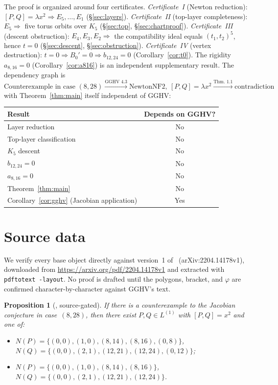 \documentclass[a4paper,11pt]{article}
\theoremstyle{plain}
\newtheorem{proposition}[theorem]{Proposition}
\theoremstyle{definition}
\theoremstyle{remark}
\begin{document}
The proof is organized around four certificates. \emph{Certificate~I} (Newton reduction): $[P,Q]=\lambda x^2\Rightarrow E_5,\dots,E_1$ (\S\ref{sec:layers}). \emph{Certificate~II} (top-layer completeness): $E_5\Rightarrow$ five torus orbits over $K_5$ (\S\ref{sec:top}, \S\ref{sec:chartproof}). \emph{Certificate~III} (descent obstruction): $E_4,E_3,E_2\Rightarrow$ the compatibility ideal equals $(t_1,t_2)^5$, hence $t=0$ (\S\ref{sec:descent}, \S\ref{sec:obstruction}). \emph{Certificate~IV} (vertex destruction): $t=0\Rightarrow B_0'=0\Rightarrow b_{12,24}=0$ (Corollary~\ref{cor:t0}). The rigidity $a_{8,16}=0$ (Corollary~\ref{cor:a816}) is an independent supplementary result. The dependency graph is
\[
\boxed{\text{Counterexample in case }(8,28)\xrightarrow{\text{GGHV 4.3}} \text{NewtonNF2},\ [P,Q]=\lambda x^2 \xrightarrow{\text{Thm.~1.1}} \text{contradiction}}
\]
with Theorem~\ref{thm:main} itself independent of GGHV:
\begin{center}
\begin{tabular}{l|c}
\textbf{Result} & \textbf{Depends on GGHV?} \\ \midrule
Layer reduction & No \\
Top-layer classification & No \\
$K_5$ descent & No \\
$b_{12,24}=0$ & No \\
$a_{8,16}=0$ & No \\
Theorem~\ref{thm:main} & No \\
Corollary~\ref{cor:gghv} (Jacobian application) & Yes
\end{tabular}
\end{center}

\section{Source data}\label{sec:source}

We verify every base object directly against version~1 of~\cite{GGHV} (arXiv:2204.14178v1), downloaded from \url{https://arxiv.org/pdf/2204.14178v1} and extracted with \texttt{pdftotext -layout}. No proof is drafted until the polygons, bracket, and $\varphi$ are confirmed character-by-character against GGHV's text.

\begin{proposition}[{\cite[Proposition~4.3]{GGHV}, source-gated}]\label{prop:gghv43}
If there is a counterexample to the Jacobian conjecture in case~$(8,28)$, then there exist $P,Q\in L^{(1)}$ with $[P,Q]=x^2$ and one of:
\begin{itemize}[nosep]
\item[(1)] $N(P)=\{(0,0),(1,0),(8,14),(8,16),(0,8)\}$,\\
$N(Q)=\{(0,0),(2,1),(12,21),(12,24),(0,12)\}$;
\item[(2)] $N(P)=\{(0,0),(1,0),(8,14),(8,16)\}$,\\
$N(Q)=\{(0,0),(2,1),(12,21),(12,24)\}$.
\end{itemize}
\end{proposition}
\end{document}
